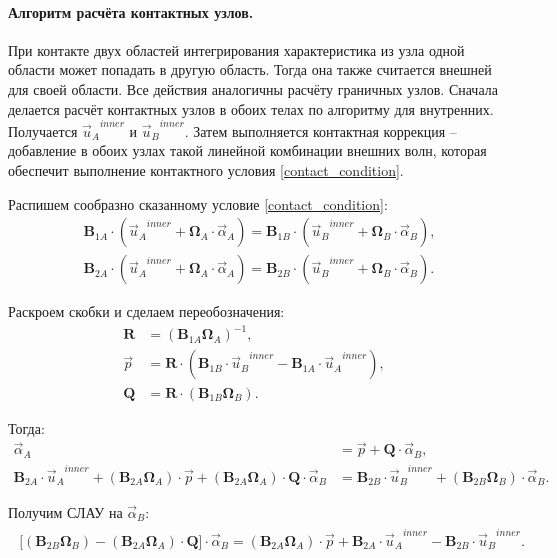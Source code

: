 \documentclass[a4paper]{article}
\numberwithin{equation}{section}
\begin{document}
\paragraph{Алгоритм расчёта контактных узлов.}
\label{sec:good-contact-case}
При контакте двух областей интегрирования характеристика из узла
одной области может попадать в другую область. Тогда она также считается
внешней для своей области. 
Все действия аналогичны расчёту граничных узлов. 
Сначала делается расчёт контактных узлов в обоих телах по алгоритму для внутренних.
Получается ${\vec{u}_A}^{inner}$ и ${\vec{u}_B}^{inner}$. 
Затем выполняется контактная коррекция -- 
добавление в обоих узлах такой линейной комбинации внешних волн, 
которая обеспечит выполнение контактного условия \eqref{contact_condition}. 

Распишем сообразно сказанному условие \eqref{contact_condition}:
\begin{eqnarray}
	\mathbf{B}_{1A} \cdot ({\vec{u}_A}^{inner} + \mathbf{\Omega}_A \cdot \vec{\alpha}_A) = \mathbf{B}_{1B} \cdot ({\vec{u}_B}^{inner} + \mathbf{\Omega}_B \cdot \vec{\alpha}_B), \\
\label{second_line_in_contact_condition_wide}
	\mathbf{B}_{2A} \cdot ({\vec{u}_A}^{inner} + \mathbf{\Omega}_A \cdot \vec{\alpha}_A) = \mathbf{B}_{2B} \cdot ({\vec{u}_B}^{inner} + \mathbf{\Omega}_B \cdot \vec{\alpha}_B).
\end{eqnarray}

Раскроем скобки и сделаем переобозначения:
\begin{align}
\label{matrixRcontact}
\mathbf{R} &= (\mathbf{B}_{1A} \mathbf{\Omega}_A)^{-1}, &\\
\vec{p} &= \mathbf{R} \cdot (\mathbf{B}_{1B} \cdot {\vec{u}_B}^{inner} - \mathbf{B}_{1A} \cdot {\vec{u}_A}^{inner}), &\\
\mathbf{Q} &= \mathbf{R} \cdot (\mathbf{B}_{1B} \mathbf{\Omega}_B).
\end{align}

Тогда:
\begin{align}
\label{alpha_A_from_B}
\vec{\alpha}_A & = \vec{p} + \mathbf{Q} \cdot \vec{\alpha}_B, &\\
\mathbf{B}_{2A} \cdot {\vec{u}_A}^{inner} + (\mathbf{B}_{2A} \mathbf{\Omega}_A) \cdot \vec{p} + (\mathbf{B}_{2A} \mathbf{\Omega}_A) \cdot \mathbf{Q} \cdot \vec{\alpha}_B & =
\mathbf{B}_{2B} \cdot {\vec{u}_B}^{inner} + (\mathbf{B}_{2B} \mathbf{\Omega}_B) \cdot \vec{\alpha}_B. &
\end{align}

Получим СЛАУ на $\vec{\alpha}_B$:
\begin{eqnarray}
\label{SLE_on_alphaB}
\begin{split}
\Bigg[  (\mathbf{B}_{2B} \mathbf{\Omega}_B) - (\mathbf{B}_{2A} \mathbf{\Omega}_A) \cdot \mathbf{Q}  \Bigg] \cdot \vec{\alpha}_B =
(\mathbf{B}_{2A} \mathbf{\Omega}_A) \cdot \vec{p} + \mathbf{B}_{2A} \cdot {\vec{u}_A}^{inner} - \mathbf{B}_{2B} \cdot {\vec{u}_B}^{inner}.
\end{split}
\end{eqnarray}
\end{document}
